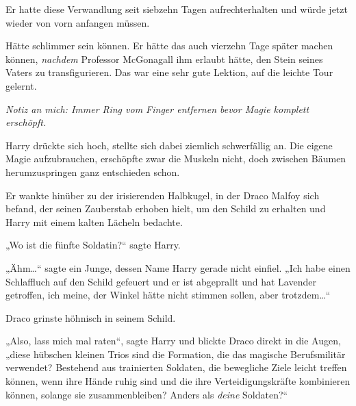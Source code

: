 Er hatte diese Verwandlung seit siebzehn Tagen aufrechterhalten und würde jetzt wieder von vorn anfangen müssen.

Hätte schlimmer sein können. Er hätte das auch vierzehn Tage später machen können, \emph{nachdem} Professor McGonagall ihm erlaubt hätte, den Stein seines Vaters zu transfigurieren. Das war eine sehr gute Lektion, auf die leichte Tour gelernt.

\emph{Notiz an mich: Immer Ring vom Finger entfernen bevor Magie komplett erschöpft.}

Harry drückte sich hoch, stellte sich dabei ziemlich schwerfällig an. Die eigene Magie aufzubrauchen, erschöpfte zwar die Muskeln nicht, doch zwischen Bäumen herumzuspringen ganz entschieden schon.

Er wankte hinüber zu der irisierenden Halbkugel, in der Draco Malfoy sich befand, der seinen Zauberstab erhoben hielt, um den Schild zu erhalten und Harry mit einem kalten Lächeln bedachte.

„Wo ist die fünfte Soldatin?“ sagte Harry.

„Ähm…“ sagte ein Junge, dessen Name Harry gerade nicht einfiel.
„Ich habe einen Schlaffluch auf den Schild gefeuert und er ist abgeprallt und hat Lavender getroffen, ich meine, der Winkel hätte nicht stimmen sollen, aber trotzdem…“

Draco grinste höhnisch in seinem Schild.

„Also, lass mich mal raten“, sagte Harry und blickte Draco direkt in die Augen, „diese hübschen kleinen Trios sind die Formation, die das magische Berufsmilitär verwendet? Bestehend aus trainierten Soldaten, die bewegliche Ziele leicht treffen können, wenn ihre Hände ruhig sind und die ihre Verteidigungskräfte kombinieren können, solange sie zusammenbleiben? Anders als \emph{deine} Soldaten?“


